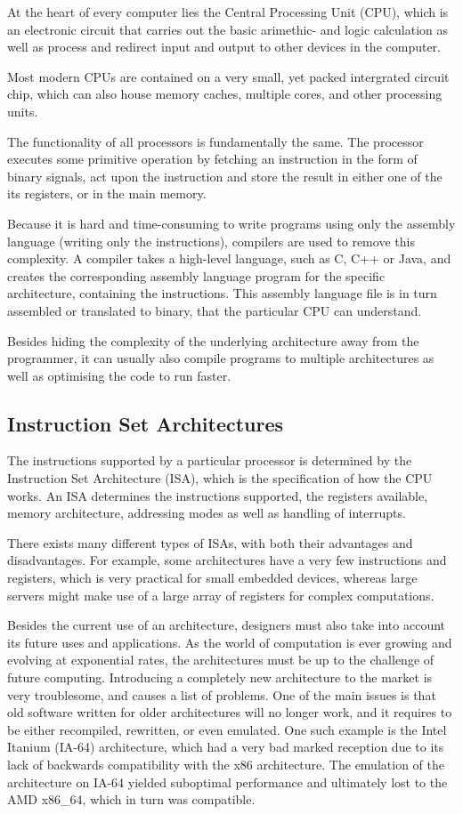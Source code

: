 At the heart of every computer lies the Central Processing Unit (CPU),
which is
an electronic circuit that carries out the basic arimethic- and logic
calculation as well as process and redirect input and output to other devices
in the computer.

Most modern CPUs are contained on a very small, yet packed intergrated circuit
chip, which can also house memory caches, multiple cores, and other processing
units.

The functionality of all processors is fundamentally the same. The processor
executes some primitive operation by fetching an instruction in the form of
binary signals, act upon the instruction and store the result in either
one of the its registers, or in the main memory.

Because it is hard and time-consuming to write programs using only the assembly language (writing
only the instructions), compilers are used to remove this complexity. A
compiler takes a high-level language, such as C, C++ or Java, and creates the
corresponding assembly language program for the specific architecture,
containing the instructions. This assembly language file is in turn assembled
or translated to binary, that the particular CPU can understand.

Besides hiding the complexity of the underlying architecture away from the
programmer, it can usually also compile programs to multiple architectures as
well as optimising the code to run faster.

\subsection{Instruction Set Architectures}
The instructions supported by a particular processor is determined by the
Instruction Set Architecture (ISA), which is the specification of how the CPU
works. An ISA determines the instructions
supported, the registers available, memory architecture, addressing modes as
well as handling of interrupts.

There exists many different types of ISAs, with both their advantages and
disadvantages. For example, some architectures have a very few instructions
and
registers, which is very practical for small embedded devices, whereas large
servers might make use of a large array of registers for complex computations.

Besides the current use of an architecture, designers must also take into
account its future uses and applications. As the world of computation is ever
growing and evolving at exponential rates, the architectures must be up to the
challenge of future computing. Introducing a completely new architecture to
the market is very troublesome, and causes a list of problems.
One of the main issues is that old software written for older architectures
will no longer work, and it requires to be either recompiled, rewritten,
or even emulated. One such example is the Intel Itanium (IA-64) architecture,
which had a very bad marked reception due to its lack of backwards compatibility
with the x86 architecture. The emulation of the architecture on IA-64 yielded
suboptimal performance and ultimately lost to the AMD x86\_64, which in turn was
compatible.\cite{anandtech:1854}

